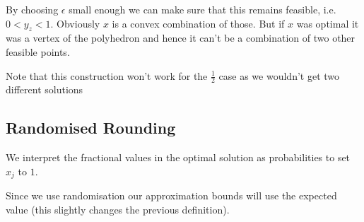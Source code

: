 \begin{Ex}
By choosing $\epsilon$ small enough we can make sure that this remains feasible, i.e. $0<y_z <1$. Obviously $x$ is a convex combination of those. But if $x$ was optimal it was a vertex of the polyhedron and hence it can't be a combination of two other feasible points.

Note that this construction won't work for the $\frac 12$ case as we wouldn't get two different solutions

\end{Ex}

\subsection{Randomised Rounding}

We interpret the fractional values in the optimal solution as probabilities to set $x_j$ to $1$.

Since we use randomisation our approximation bounds will use the expected value (this slightly changes the previous definition).

